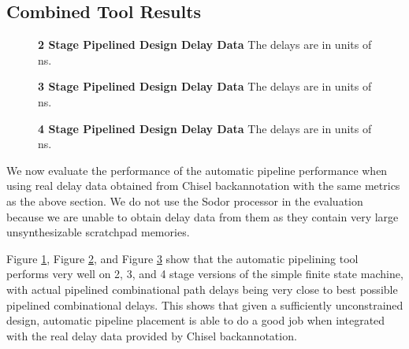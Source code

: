 \subsection{Combined Tool Results}
\begin{figure}[htb]
\centering
{}
\caption{{\bf 2 Stage Pipelined Design Delay Data} The delays are in units of ns.}
\label{fig:comb_delays2}
\end{figure}
\begin{figure}[htb]
\centering
{}
\caption{{\bf 3 Stage Pipelined Design Delay Data} The delays are in units of ns.}
\label{fig:comb_delays3}
\end{figure}
\begin{figure}[htb]
\centering
{}
\caption{{\bf 4 Stage Pipelined Design Delay Data} The delays are in units of ns.}
\label{fig:comb_delays4}
\end{figure}
We now evaluate the performance of the automatic pipeline performance when using real delay data obtained from Chisel backannotation with the same metrics as the above section. We do not use the Sodor processor in the evaluation because we are unable to obtain delay data from them as they contain very large unsynthesizable scratchpad memories. 

Figure \ref{fig:comb_delays2}, Figure \ref{fig:comb_delays3}, and Figure \ref{fig:comb_delays4} show that the automatic pipelining tool performs very well on 2, 3, and 4 stage versions of the simple finite state machine, with actual pipelined combinational path delays being very close to best possible pipelined combinational delays.  This shows that given a sufficiently unconstrained design, automatic pipeline placement is able to do a good job when integrated with the real delay data provided by Chisel backannotation.

